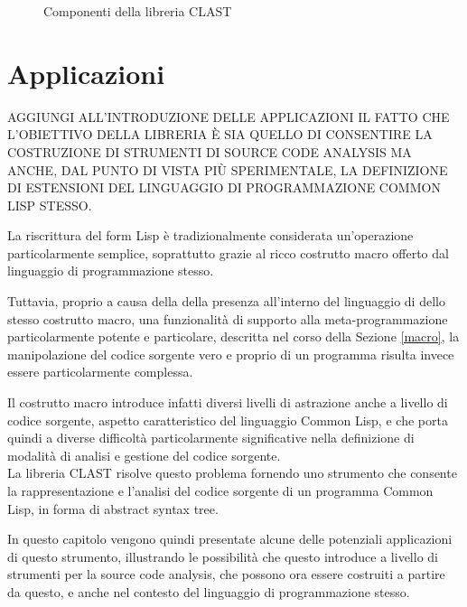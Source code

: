 \documentclass{book}
\newcommand{\image}[4]{
  \begin{figure}[H]
  \makebox[\textwidth][c]{
    \texttt{[image: \#1]}
  }
  \caption{#2}
  \label{#3}
  \end{figure}
}
\begin{document}
\image{img/clast-architecture.png}
      {Componenti della libreria CLAST}
      {fig:clast-architecture}
      {0.5}





\endgroup

\begingroup
\let\clearpage\relax

\chapter{Applicazioni}
\label{applications}

AGGIUNGI ALL’INTRODUZIONE DELLE APPLICAZIONI IL FATTO CHE L’OBIETTIVO DELLA
LIBRERIA È SIA QUELLO DI CONSENTIRE LA COSTRUZIONE DI STRUMENTI DI SOURCE CODE
ANALYSIS MA ANCHE, DAL PUNTO DI VISTA PIÙ SPERIMENTALE, LA DEFINIZIONE DI
ESTENSIONI DEL LINGUAGGIO DI PROGRAMMAZIONE COMMON LISP STESSO.

La riscrittura del form Lisp è tradizionalmente considerata un'operazione
particolarmente semplice, soprattutto grazie al ricco costrutto macro offerto
dal linguaggio di programmazione stesso.

Tuttavia, proprio a causa della della presenza all'interno del linguaggio di
dello stesso costrutto macro, una funzionalità di supporto alla
meta-programmazione particolarmente potente e particolare, descritta nel corso
della Sezione \ref{macro}, la manipolazione del codice sorgente vero e proprio
di un programma risulta invece essere particolarmente complessa.

Il costrutto macro introduce infatti diversi livelli di astrazione anche a
livello di codice sorgente, aspetto caratteristico del linguaggio Common Lisp, e
che porta quindi a diverse difficoltà particolarmente significative nella
definizione di modalità di analisi e gestione del codice sorgente.\\


La libreria CLAST risolve questo problema fornendo uno strumento che consente la
rappresentazione e l'analisi del codice sorgente di un programma Common Lisp, in
forma di abstract syntax tree.

In questo capitolo vengono quindi presentate alcune delle potenziali
applicazioni di questo strumento, illustrando le possibilità che questo
introduce a livello di strumenti per la source code analysis, che possono ora
essere costruiti a partire da questo, e anche nel contesto del linguaggio di
programmazione stesso.
\end{document}
